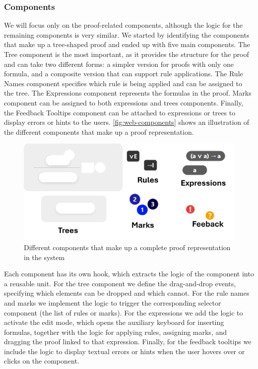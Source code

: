 \subsubsection{Components}
We will focus only on the proof-related components, although the logic for the remaining components is very similar. We started by identifying the components that make up a tree-shaped proof and ended up with five main components. The Tree component is the most important, as it provides the structure for the proof and can take two different forms: a simpler version for proofs with only one formula, and a composite version that can support rule applications. The Rule Names component specifies which rule is being applied and can be assigned to the tree. The Expressions component represents the formulas in the proof. Marks component can be assigned to both expressions and trees components. Finally, the Feedback Tooltips component can be attached to expressions or trees to display errors or hints to the users. \autoref{fig:web-components} shows an illustration of the different components that make up a proof representation.
 
\begin{figure}[h!]
    \centering
    \includegraphics[width=0.90\linewidth]{Chapters/Figures/components.png}
    \caption{Different components that make up a complete proof representation in the system}

    \label{fig:web-components}
\end{figure}

Each component has its own hook, which extracts the logic of the component into a reusable unit. For the tree component we define the drag-and-drop events, specifying which elements can be dropped and which cannot. For the rule names and marks we implement the logic to trigger the corresponding selector component (the list of rules or marks). For the expressions we add the logic to activate the edit mode, which opens the auxiliary keyboard for inserting formulas, together with the logic for applying rules, assigning marks, and dragging the proof linked to that expression. Finally, for the feedback tooltips we include the logic to display textual errors or hints when the user hovers over or clicks on the component.

